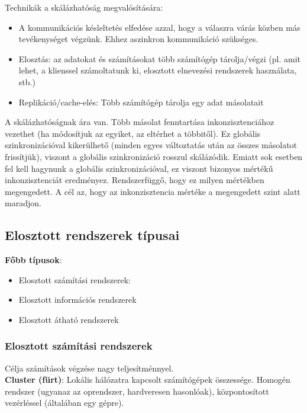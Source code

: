 \documentclass[margin=0px]{article}
\begin{document}
\noindent Technikák a skálázhatóság megvalósítására:

\begin{itemize}
    \item	A kommunikációs késleltetés elfedése azzal, hogy a válaszra várás közben más tevékenységet végzünk. Ehhez
          aszinkron kommunikáció szükséges.

    \item	Elosztás: az adatokat és számításokat több számítógép tárolja/végzi (pl. amit lehet, a klienssel számoltatunk ki,
          elosztott elnevezési rendszerek használata, stb.)

    \item	Replikáció/cache-elés:  Több számítógép tárolja egy adat másolatait
\end{itemize}

A skálázhatóságnak ára van. Több másolat fenntartása inkonzisztenciához vezethet (ha módosítjuk az egyiket, az eltérhet a többitől).
Ez globális szinkronizációval kikerülhető (minden egyes változtatás után az összes másolatot frissítjük), viszont a globális
szinkronizáció rosszul skálázódik. Emiatt sok esetben fel kell hagynunk a globális szinkronizációval, ez viszont bizonyos
mértékű inkonzisztenciát eredményez. Rendszerfüggő, hogy ez milyen mértékben megengedett. A cél az, hogy az inkonzisztencia mértéke
a megengedett szint alatt maradjon.

\subsection{Elosztott rendszerek típusai}

\noindent \textbf{Főbb típusok}:
\begin{itemize}
    \item	Elosztott számítási rendszerek:
    \item	Elosztott információs rendszerek
    \item 	Elosztott átható rendszerek
\end{itemize}

\subsubsection{Elosztott számítási rendszerek}

Célja számítások végzése nagy teljesítménnyel.\\

\noindent \textbf{Cluster (fürt)}: Lokális hálózatra kapcsolt számítógépek összessége. Homogén rendszer (ugyanaz az oprendszer,
hardveresen hasonlóak), központosított vezérléssel (általában egy gépre).\\
\end{document}
